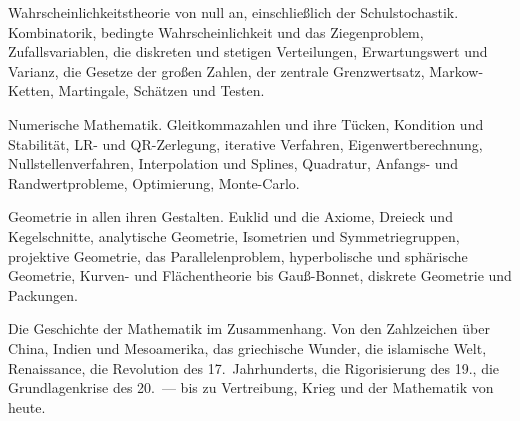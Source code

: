 \begin{merksatz}
Wahrscheinlichkeitstheorie von null an, einschließlich der Schulstochastik. Kombinatorik, bedingte Wahrscheinlichkeit und das Ziegenproblem, Zufallsvariablen, die diskreten und stetigen Verteilungen, Erwartungswert und Varianz, die Gesetze der großen Zahlen, der zentrale Grenzwertsatz, Markow-Ketten, Martingale, Schätzen und Testen.

\end{merksatz}

\begin{merksatz}
Numerische Mathematik. Gleitkommazahlen und ihre Tücken, Kondition und Stabilität, LR- und QR-Zerlegung, iterative Verfahren, Eigenwertberechnung, Nullstellenverfahren, Interpolation und Splines, Quadratur, Anfangs- und Randwertprobleme, Optimierung, Monte-Carlo.

\end{merksatz}

\begin{merksatz}
Geometrie in allen ihren Gestalten. Euklid und die Axiome, Dreieck und Kegelschnitte, analytische Geometrie, Isometrien und Symmetriegruppen, projektive Geometrie, das Parallelenproblem, hyperbolische und sphärische Geometrie, Kurven- und Flächentheorie bis Gauß-Bonnet, diskrete Geometrie und Packungen.

\end{merksatz}

\begin{merksatz}
Die Geschichte der Mathematik im Zusammenhang. Von den Zahlzeichen über China, Indien und Mesoamerika, das griechische Wunder, die islamische Welt, Renaissance, die Revolution des 17.\ Jahrhunderts, die Rigorisierung des 19., die Grundlagenkrise des 20.\ --- bis zu Vertreibung, Krieg und der Mathematik von heute.

\end{merksatz}

